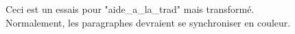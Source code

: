 Ceci est un essais pour "aide_a_la_trad" mais transformé.\\
Normalement, les paragraphes devraient se synchroniser en couleur.\\
\\
